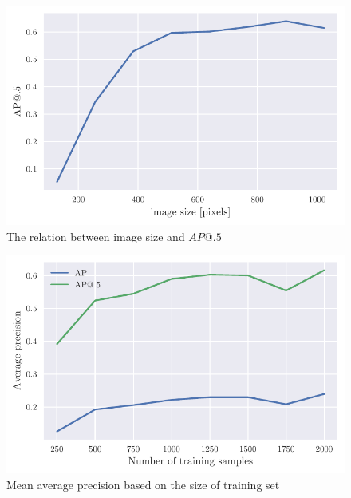 \begin{paracol}{2}
    \begin{figure}
        \centering
        \includegraphics[width=0.99\linewidth]{images/img_size_dependency.pdf}
        \caption{The relation between image size and $AP@.5$}
        \label{fig:img_sizes}
    \end{figure}
    \switchcolumn
    \begin{figure}
        \centering
        \includegraphics[width=0.99\linewidth]{images/training_set_dependency.pdf}
        \caption{Mean average precision based on the size of training set}
        \label{fig:training_set_sizes}
    \end{figure}
\end{paracol}

